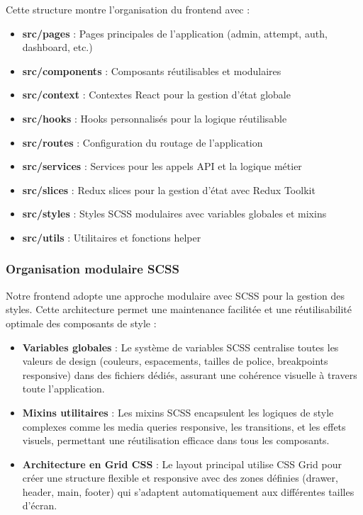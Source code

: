 \documentclass[12pt,a4paper]{report}
\begin{document}
Cette structure montre l'organisation du frontend avec :
\begin{itemize}
\item \textbf{src/pages} : Pages principales de l'application (admin, attempt, auth, dashboard, etc.)
\item \textbf{src/components} : Composants réutilisables et modulaires
\item \textbf{src/context} : Contextes React pour la gestion d'état globale
\item \textbf{src/hooks} : Hooks personnalisés pour la logique réutilisable
\item \textbf{src/routes} : Configuration du routage de l'application
\item \textbf{src/services} : Services pour les appels API et la logique métier
\item \textbf{src/slices} : Redux slices pour la gestion d'état avec Redux Toolkit
\item \textbf{src/styles} : Styles SCSS modulaires avec variables globales et mixins
\item \textbf{src/utils} : Utilitaires et fonctions helper
\end{itemize}

\subsubsection{Organisation modulaire SCSS}

Notre frontend adopte une approche modulaire avec SCSS pour la gestion des styles. Cette architecture permet une maintenance facilitée et une réutilisabilité optimale des composants de style :

\begin{itemize}
\item \textbf{Variables globales} : Le système de variables SCSS centralise toutes les valeurs de design (couleurs, espacements, tailles de police, breakpoints responsive) dans des fichiers dédiés, assurant une cohérence visuelle à travers toute l'application.

\item \textbf{Mixins utilitaires} : Les mixins SCSS encapsulent les logiques de style complexes comme les media queries responsive, les transitions, et les effets visuels, permettant une réutilisation efficace dans tous les composants.

\item \textbf{Architecture en Grid CSS} : Le layout principal utilise CSS Grid pour créer une structure flexible et responsive avec des zones définies (drawer, header, main, footer) qui s'adaptent automatiquement aux différentes tailles d'écran.
\end{itemize}
\end{document}
